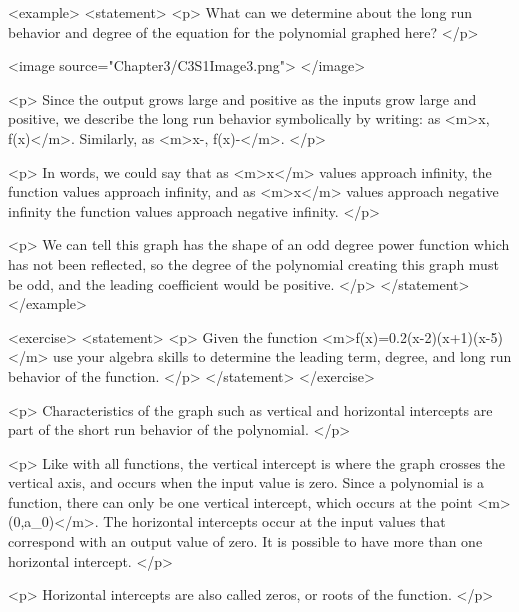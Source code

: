         <example>
            <statement>
                <p>
                    What can we determine about the long run behavior and degree of the equation for the polynomial graphed here?
                </p>

                <image source="Chapter3/C3S1Image3.png">
                </image>

                <p>
                    Since the output grows large and positive as the inputs grow large and positive, we describe the long run behavior symbolically by writing: as <m>x\rightarrow \infty, f(x)\rightarrow \infty</m>.
                    Similarly, as <m>x\rightarrow -\infty, f(x)\rightarrow-\infty</m>.
                </p>

                <p>
                    In words, we could say that as <m>x</m> values approach infinity, the function values approach infinity, and as <m>x</m> values approach negative infinity the function values approach negative infinity.
                </p>

                <p>
                    We can tell this graph has the shape of an odd degree power function which has not been reflected, so the degree of the polynomial creating this graph must be odd, and the leading coefficient would be positive.
                </p>
            </statement>
        </example>

        <exercise>
            <statement>
                <p>
                    Given the function <m>f(x)=0.2(x-2)(x+1)(x-5)</m> use your algebra skills to determine the leading term, degree, and long run behavior of the function.
                </p>
            </statement>
        </exercise>

        <p>
            Characteristics of the graph such as vertical and horizontal intercepts are part of the short run behavior of the polynomial.
        </p>

        <p>
            Like with all functions, the vertical intercept is where the graph crosses the vertical axis, and occurs when the input value is zero.
            Since a polynomial is a function, there can only be one vertical intercept, which occurs at the point <m>(0,a_{0})</m>.
            The horizontal intercepts occur at the input values that correspond with an output value of zero.
            It is possible to have more than one horizontal intercept.
        </p>

        <p>
            Horizontal intercepts are also called zeros, or roots of the function.
        </p>

